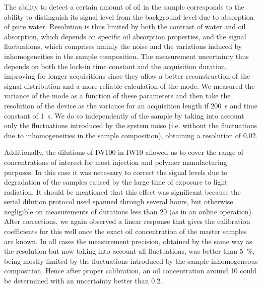 \documentclass[10pt,authoryear,twocolumn]{article}
\begin{document}
The ability to detect a certain amount of oil in the sample corresponds to the ability to distinguish its signal level from the background level due to absorption of pure water. Resolution is thus limited by both the contrast of water and oil absorption, which depends on specific oil absorption properties, and the signal fluctuations, which comprises mainly the noise and the variations induced by inhomogeneities in the sample composition. The measurement uncertainty thus depends on both the lock-in time constant %
and the acquisition duration, improving for longer acquisitions since they allow a better reconstruction of the signal distribution and a more reliable calculation of the mode. We measured the variance of the mode as a function of these parameters %
and then take the resolution of the device as the variance for an acquisition length if \SI{200}{\s} and time constant of \SI{1}{\s}. We do so independently of the sample by taking into account only the fluctuations introduced by the system noise (i.e. without the fluctuations due to inhomogeneities in the sample composition), obtaining a resolution of \SI{0.02}{\ppm}.%

Additionally, the dilutions of IW100 in IW10 allowed us to cover the range of concentrations of interest for most injection and polymer manufacturing purposes. In this case it was necessary to correct the signal levels due to degradation of the samples caused by the large time of exposure to light radiation. It should be mentioned that this effect was significant because the serial dilution protocol used spanned through several hours, but otherwise negligible on measurements of durations less than \SI{20}{\min} (as in an online operation). After corrections, we again observed a linear response that gives the calibration coefficients for this well once the exact oil concentration of the master samples are known. In all cases the measurement precision, obtained by the same way as the resolution but now taking into account all fluctuations, was better than \SI{5}{\percent}, being mostly limited by the fluctuations introduced by the sample inhomogeneous composition. Hence after proper calibration, an oil concentration around \SI{10}{\ppm} could be determined with an uncertainty better than \SI{0.2}{\ppm}. \\
\end{document}
